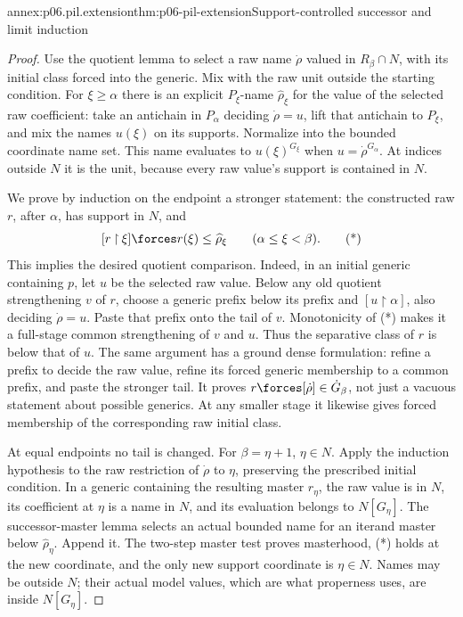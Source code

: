 \begin{annexitem}{annex:p06.pil.extension}{thm:p06-pil-extension}{Support-controlled successor and limit induction}
\begin{proof}
Use the quotient lemma to select a raw name \(\dot\rho\) valued in
\(R_\beta\cap N\), with its initial class forced into the generic.
Mix with the raw unit outside the starting condition. For \(\xi\geq\alpha\)
there is an explicit \(P_\xi\)-name \(\widehat\rho_\xi\) for the
value of the selected raw coefficient: take an antichain in \(P_\alpha\)
deciding \(\dot\rho=u\), lift that antichain to \(P_\xi\), and mix
the names \(u(\xi)\) on its supports. Normalize into the bounded
coordinate name set. This name evaluates to \(u(\xi)^{G_\xi}\)
when \(u=\dot\rho^{G_\alpha}\). At indices outside \(N\) it is the
unit, because every raw value's support is contained in \(N\).

We prove by induction on the endpoint a stronger statement: the constructed
raw \(r\), after \(\alpha\), has support in \(N\), and
\[
 [r\mathbin{\upharpoonright}\xi]\forces
       r(\xi)\leq\widehat\rho_\xi\qquad(\alpha\leq\xi<\beta).
 \tag{*}
\]
This implies the desired quotient comparison. Indeed, in an initial
generic containing \(p\), let \(u\) be the selected raw value.
Below any old quotient strengthening \(v\) of \(r\), choose a generic
prefix below its prefix and \([u\mathbin{\upharpoonright}\alpha]\),
also deciding \(\dot\rho=u\). Paste that prefix onto the tail of
\(v\). Monotonicity of (*) makes it a full-stage common strengthening
of \(v\) and \(u\). Thus the separative class of \(r\) is below that
of \(u\). The same argument has a ground dense formulation: refine a
prefix to decide the raw value, refine its forced generic membership
to a common prefix, and paste the stronger tail. It proves
\(r\forces[\dot\rho]\in\dot G_\beta\), not just a vacuous statement
about possible generics. At any smaller stage it likewise gives forced
membership of the corresponding raw initial class.

At equal endpoints no tail is changed. For \(\beta=\eta+1\),
\(\eta\in N\). Apply the induction hypothesis to the raw restriction
of \(\dot\rho\) to \(\eta\), preserving the prescribed initial
condition. In a generic containing the resulting master \(r_\eta\),
the raw value is in \(N\), its coefficient at \(\eta\) is a name
in \(N\), and its evaluation belongs to \(N[G_\eta]\).
The successor-master lemma selects an actual bounded name for an
iterand master below \(\widehat\rho_\eta\). Append it. The two-step
master test proves masterhood, (*) holds at the new coordinate, and
the only new support coordinate is \(\eta\in N\). Names may be outside
\(N\); their actual model values, which are what properness uses, are
inside \(N[G_\eta]\).


\end{proof}
\end{annexitem}
